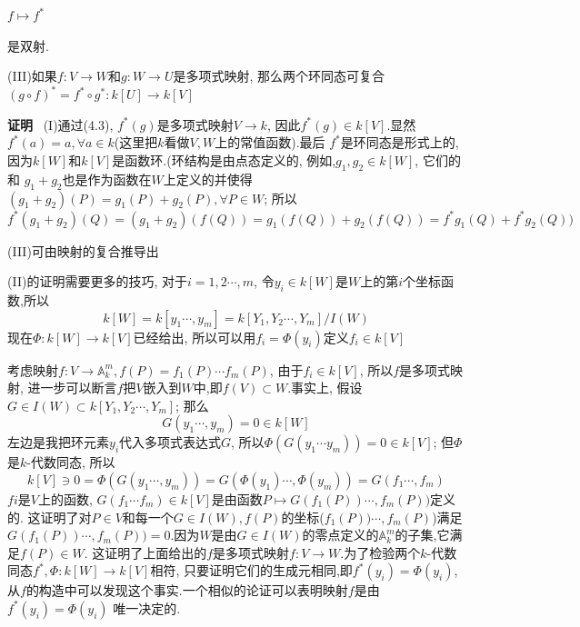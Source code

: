 \documentclass[UTF8]{book}
\begin{document}
			  $ f \longmapsto f^{*}$

		\justifying


		是双射.

		(III)如果$ f:V \rightarrow W $和$ g:W \rightarrow U $是多项式映射, 那么两个环同态可复合$(g\circ f)^{*}=f^{*}\circ g^{*}:k[U]\rightarrow k[V]$

		\textbf{证明} \ (I)通过(4.3), $f^{*}(g)$是多项式映射$V\rightarrow k$, 因此$f^{*}(g)\in k[V]$.显然 $f^{*}(a)=a, \forall a\in k$(这里把$ k $看做$ V,W $上的常值函数).最后 $f^{*}$是环同态是形式上的, 因为$ k[W] $和$ k[V] $是函数环.(环结构是由点态定义的, 例如,$g_{1},g_{2}\in k[W]$, 它们的和 $g_{1}+g_{2}$也是作为函数在$ W $上定义的并使得$(g_{1}+g_{2})(P)=g_{1}(P)+g_{2}(P) ,\forall P\in W$; 所以$f^{*}(g_{1}+g_{2})(Q)=(g_{1}+g_{2})(f(Q))= g_{1}(f(Q))+g_{2}(f(Q))= f^{*}g_{1}(Q)+f^{*}g_{2}(Q))$

		(III)可由映射的复合推导出

		(II)的证明需要更多的技巧, 对于$i=1,2\cdots,m$, 令$y_{i}\in k[W]$是$ W $上的第$ i $个坐标函数,所以
		\begin{equation*}
		k[W]=k[y_{1}  \cdots, y_{m}]=k[Y_{1},Y_{2} \cdots,Y_{m}]/I(W)
		\end{equation*}
		现在$\Phi:k[W]\rightarrow k[V]$已经给出, 所以可以用$f_{i}=\Phi(y_{i})$定义$f_{i}\in k[V]$

		考虑映射$f:V \rightarrow \mathbb{A}^{m}_{k}, f(P)=f_{1}(P)\cdots f_{m}(P)$, 由于$f_{i}\in k[V]$, 所以$ f $是多项式映射, 进一步可以断言$ f $把$ V $嵌入到$ W $中,即$f(V)\subset W$.事实上, 假设$G\in I(W)\subset k[Y_{1},Y_{2}\cdots,Y_{m}]$; 那么
		\begin{equation*}
		G(y_{1}\cdots ,y_{m})=0\in k[W]
		\end{equation*}
		左边是我把环元素$y_{i}$代入多项式表达式$ G $, 所以$\Phi(G(y_{1}\cdots y_{m}))=0\in k[V]$; 但$ \Phi$是$ k $-代数同态, 所以
		\begin{equation*}
		k[V]\ni 0=\Phi(G(y_{1}\cdots, y_{m}))=G(\Phi(y_{1})\cdots ,\Phi(y_{m}))=G(f_{1}\cdots ,f_{m})
		\end{equation*}
		$f{i}$是$ V $上的函数, $G(f_{1}\cdots f_{m})\in k[V]$是由函数$P\mapsto G(f_{1}(P))\cdots ,f_{m}(P))$定义的. 这证明了对$P\in V$和每一个$G\in I(W),f(P)$的坐标($f_{1}(P))\cdots ,f_{m}(P)$)满足$G(f_{1}(P))\cdots ,f_{m}(P))=0$.因为$ W $是由$G\in I(W)$的零点定义的$\mathbb{A}^{m}_{k}$的子集,它满足$f(P)\in W$. 这证明了上面给出的$ f $是多项式映射$ f:V \rightarrow W $.为了检验两个$ k $-代数同态$f^{*},\Phi:k[W]\rightarrow k[V]$相符, 只要证明它们的生成元相同,即$f^{*}(y_{i})=\Phi(y_{i})$,从$ f $的构造中可以发现这个事实.一个相似的论证可以表明映射$ f $是由$f^{*}(y_{i})=\Phi(y_{i})$  唯一决定的.
\end{document}
